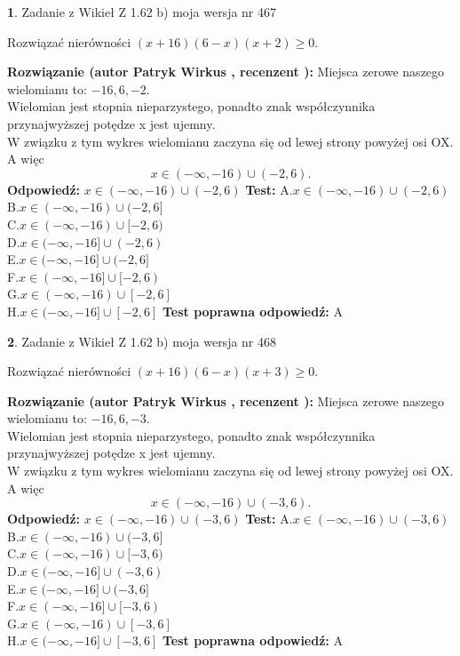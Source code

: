 \documentclass[12pt, a4paper]{article}
\theoremstyle{definition} %
\newtheorem{zad}{}
\newcommand{\zadStart}[1]{\begin{zad}#1\newline}
\newcommand{\zadStop}{\end{zad}}
\newcommand{\rozwStart}[2]{\noindent \textbf{Rozwiązanie (autor #1 , recenzent #2): }\newline}
\newcommand{\rozwStop}{\newline}
\newcommand{\odpStart}{\noindent \textbf{Odpowiedź:}\newline}
\newcommand{\odpStop}{\newline}
\newcommand{\testStart}{\noindent \textbf{Test:}\newline}
\newcommand{\testStop}{\newline}
\newcommand{\kluczStart}{\noindent \textbf{Test poprawna odpowiedź:}\newline}
\newcommand{\kluczStop}{\newline}
\begin{document}
\zadStart{Zadanie z Wikieł Z 1.62 b) moja wersja nr 467}

Rozwiązać nierówności $(x+16)(6-x)(x+2)\ge0$.
\zadStop
\rozwStart{Patryk Wirkus}{}
Miejsca zerowe naszego wielomianu to: $-16, 6, -2$.\\
Wielomian jest stopnia nieparzystego, ponadto znak współczynnika przy\linebreak najwyższej potędze x jest ujemny.\\ W związku z tym wykres wielomianu zaczyna się od lewej strony powyżej osi OX. A więc $$x \in (-\infty,-16) \cup (-2,6).$$
\rozwStop
\odpStart
$x \in (-\infty,-16) \cup (-2,6)$
\odpStop
\testStart
A.$x \in (-\infty,-16) \cup (-2,6)$\\
B.$x \in (-\infty,-16) \cup (-2,6]$\\
C.$x \in (-\infty,-16) \cup [-2,6)$\\
D.$x \in (-\infty,-16] \cup (-2,6)$\\
E.$x \in (-\infty,-16] \cup (-2,6]$\\
F.$x \in (-\infty,-16] \cup [-2,6)$\\
G.$x \in (-\infty,-16) \cup [-2,6]$\\
H.$x \in (-\infty,-16] \cup [-2,6]$
\testStop
\kluczStart
A
\kluczStop



\zadStart{Zadanie z Wikieł Z 1.62 b) moja wersja nr 468}

Rozwiązać nierówności $(x+16)(6-x)(x+3)\ge0$.
\zadStop
\rozwStart{Patryk Wirkus}{}
Miejsca zerowe naszego wielomianu to: $-16, 6, -3$.\\
Wielomian jest stopnia nieparzystego, ponadto znak współczynnika przy\linebreak najwyższej potędze x jest ujemny.\\ W związku z tym wykres wielomianu zaczyna się od lewej strony powyżej osi OX. A więc $$x \in (-\infty,-16) \cup (-3,6).$$
\rozwStop
\odpStart
$x \in (-\infty,-16) \cup (-3,6)$
\odpStop
\testStart
A.$x \in (-\infty,-16) \cup (-3,6)$\\
B.$x \in (-\infty,-16) \cup (-3,6]$\\
C.$x \in (-\infty,-16) \cup [-3,6)$\\
D.$x \in (-\infty,-16] \cup (-3,6)$\\
E.$x \in (-\infty,-16] \cup (-3,6]$\\
F.$x \in (-\infty,-16] \cup [-3,6)$\\
G.$x \in (-\infty,-16) \cup [-3,6]$\\
H.$x \in (-\infty,-16] \cup [-3,6]$
\testStop
\kluczStart
A
\kluczStop
\end{document}

